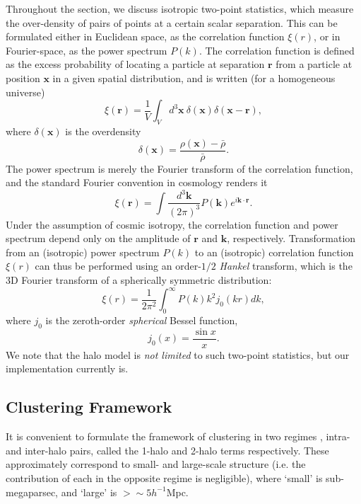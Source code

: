 \documentclass[5p]{elsarticle}
\begin{document}
Throughout the section, we discuss isotropic two-point statistics, which measure the over-density of pairs of points at a certain scalar separation. This can be formulated either in Euclidean space, as the correlation function $\xi(r)$, or in Fourier-space, as the power spectrum $P(k)$. 
The correlation function is defined as the excess probability of locating a particle at separation $\mathbf{r}$ from a particle at position $\mathbf{x}$ in a given spatial distribution, and is written (for a homogeneous universe)
\begin{equation}
    \xi(\mathbf{r}) = \frac{1}{V}\int_V d^3\mathbf{x}\ \delta(\mathbf{x}) \delta(\mathbf{x} - \mathbf{r}),
\end{equation}
where $\delta(\mathbf{x})$ is the overdensity
\begin{equation}
    \delta(\mathbf{x}) = \frac{\rho(\mathbf{x}) - \bar{\rho}}{\bar{\rho}}.
\end{equation}
The power spectrum is merely the Fourier transform of the correlation function, and the standard Fourier convention in cosmology renders it
\begin{equation}
    \xi(\mathbf{r}) = \int \frac{d^3 \mathbf{k}}{(2\pi)^3} P(\mathbf{k}) e^{i \mathbf{k}\cdot \mathbf{r}}.
\end{equation}
Under the assumption of cosmic isotropy, the correlation function and power spectrum depend only on the amplitude of $\mathbf{r}$ and $\mathbf{k}$, respectively. Transformation from an (isotropic) power spectrum $P(k)$ to an (isotropic) correlation function $\xi(r)$ can thus be performed using an order-$1/2$ \textit{Hankel} transform, which is the 3D Fourier transform of a spherically symmetric distribution:
\begin{equation}
\label{eq:hankel}
\xi(r) = \frac{1}{2\pi^2}\int_0^\infty P(k)k^2 j_0(kr)dk,
\end{equation}
where $j_0$ is the zeroth-order \textit{spherical} Bessel function,
\begin{equation}
    j_0(x) = \frac{\sin x}{x}.
\end{equation}
We note that the halo model is \textit{not limited} to such two-point statistics, but our implementation currently is.

\subsection{Clustering Framework}
\label{sec:haloclustering}
It is convenient to formulate the framework of clustering in two regimes \citep{Seljak2000}, intra- and inter-halo pairs, called the 1-halo and 2-halo terms respectively. These approximately correspond to small- and large-scale structure (i.e. the contribution of each in the opposite regime is negligible), where `small' is sub-megaparsec, and `large' is $>\sim5h^{-1}$Mpc. 
\end{document}
